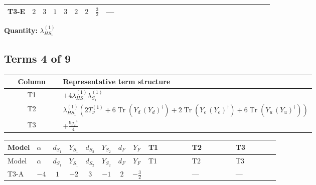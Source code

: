 \documentclass[8pt]{article}
\begin{document}
\begin{landscape}
\begin{longtable}{@{}llcccccc >{\raggedright\arraybackslash}p{0.21\linewidth} >{\raggedright\arraybackslash}p{0.21\linewidth} >{\raggedright\arraybackslash}p{0.21\linewidth}@{}}
\midrule
T3-E & $2$ & $3$ & $1$ & $3$ & $2$ & $2$ & $\frac{3}{2}$ & --- & \scriptsize\adjustbox{max width=\linewidth}{$\begin{gathered} +6 {\lambda_1} {\lambda_{HS_1}^{(1)}}\end{gathered}$} & \scriptsize\adjustbox{max width=\linewidth}{$\begin{gathered} +4 {\lambda_{HS_1}^{(1)}}^2\end{gathered}$} \\
\midrule
\bottomrule
\end{longtable}
\clearpage
\noindent\textbf{Quantity: }$\lambda_{HS_1}^{(1)}$\par\smallskip
\subsection*{Terms 4 of 9}
\begin{center}
\begin{tabular}{@{}c >{\raggedright\arraybackslash}p{0.82\linewidth}@{}}
\toprule
Column & Representative term structure \\
\midrule
T1 & \(\displaystyle +4 {\lambda_{HS_1}^{(1)}} {\lambda_{S_1}^{(1)}}\) \\
\midrule
T2 & \(\displaystyle {\lambda_{HS_1}^{(1)}} (2 T_{\nu}^{(1)}+6 \operatorname{Tr}\!\left({Y_d}\,\left({Y_d}\right)^{\dagger}\right)+2 \operatorname{Tr}\!\left({Y_e}\,\left({Y_e}\right)^{\dagger}\right)+6 \operatorname{Tr}\!\left({Y_u}\,\left({Y_u}\right)^{\dagger}\right))\) \\
\midrule
T3 & \(\displaystyle +\frac{9 {g_2}^4}{4}\) \\
\midrule
\bottomrule
\end{tabular}
\end{center}
\smallskip
\tiny
\begin{longtable}{@{}llcccccc >{\raggedright\arraybackslash}p{0.21\linewidth} >{\raggedright\arraybackslash}p{0.21\linewidth} >{\raggedright\arraybackslash}p{0.21\linewidth}@{}}
\toprule
Model & $\alpha$ & $d_{S_1}$ & $Y_{S_1}$ & $d_{S_2}$ & $Y_{S_2}$ & $d_F$ & $Y_F$ & T1 & T2 & T3 \\
\midrule
\endfirsthead
\toprule
Model & $\alpha$ & $d_{S_1}$ & $Y_{S_1}$ & $d_{S_2}$ & $Y_{S_2}$ & $d_F$ & $Y_F$ & T1 & T2 & T3 \\
\midrule
\endhead
T3-A & $-4$ & $1$ & $-2$ & $3$ & $-1$ & $2$ & $-\frac{3}{2}$ & \scriptsize\adjustbox{max width=\linewidth}{$\begin{gathered} +4 {\lambda_{HS_1}^{(1)}} {\lambda_{S_1}^{(1)}}\end{gathered}$} & --- & --- \\

\end{longtable}
\end{landscape}
\end{document}
